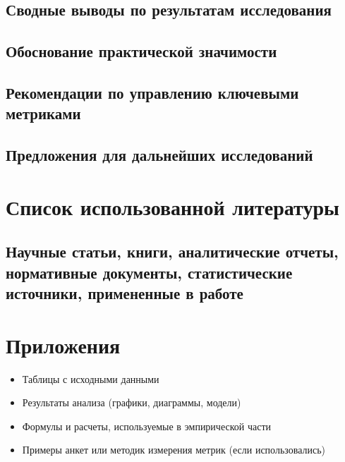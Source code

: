 \documentclass[12pt]{article}
\begin{document}
\subsection{Сводные выводы по результатам исследования}
\vspace{0.5em}

\subsection{Обоснование практической значимости}
\vspace{0.5em}

\subsection{Рекомендации по управлению ключевыми метриками}
\vspace{0.5em}

\subsection{Предложения для дальнейших исследований}
\vspace{0.5em}

\newpage
\section{Список использованной литературы}

\subsection{Научные статьи, книги, аналитические отчеты, нормативные документы, статистические источники, примененные в работе}
\vspace{0.5em}

\newpage
\section{Приложения}

\begin{itemize}
    \item Таблицы с исходными данными
    \item Результаты анализа (графики, диаграммы, модели)
    \item Формулы и расчеты, используемые в эмпирической части
    \item Примеры анкет или методик измерения метрик (если использовались)
\end{itemize}
\end{document}
